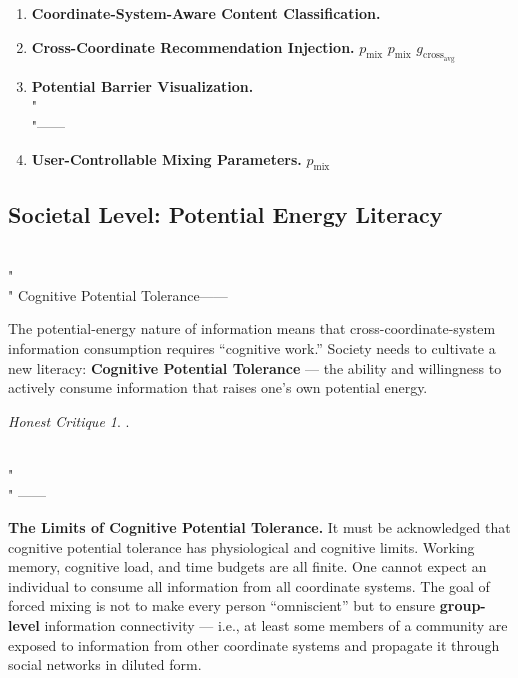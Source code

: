 \documentclass[11pt,a4paper]{article}
\theoremstyle{remark}
\newtheorem{honestattack}{Honest Critique}
\newenvironment{attackbox}{%
  \begin{center}
  \color{red}
  \begin{minipage}{0.92\textwidth}
  \begin{honestattack}
}{%
  \end{honestattack}
  \end{minipage}
  \end{center}
}
\newcommand{\GCoupling}{g_{\text{cross}}}
\begin{document}
\begin{enumerate}[label= \arabic*:, leftmargin=*]
\item \textbf{Coordinate-System-Aware Content Classification.}



\item \textbf{Cross-Coordinate Recommendation Injection.}
 $p_{\text{mix}}$ 
$p_{\text{mix}}$  $\GCoupling_{\text{avg}}$ 

\item \textbf{Potential Barrier Visualization.}
\\"\\"——


\item \textbf{User-Controllable Mixing Parameters.}
 $p_{\text{mix}}$
\end{enumerate}

\subsection{}

\subsection{Societal Level: Potential Energy Literacy}

\\"\\"
\textbf{}
Cognitive Potential Tolerance——


The potential-energy nature of information means that cross-coordinate-system information
consumption requires ``cognitive work.'' Society needs to cultivate a new literacy:
\textbf{Cognitive Potential Tolerance} --- the ability and willingness to actively
consume information that raises one's own potential energy.

\begin{attackbox}
  \textbf{}.
  
  
  
  \\"\\"
  \textbf{}——
  
  

  \textbf{The Limits of Cognitive Potential Tolerance.}
  It must be acknowledged that cognitive potential tolerance has physiological and
  cognitive limits. Working memory, cognitive load, and time budgets are all finite.
  One cannot expect an individual to consume all information from all coordinate systems.
  The goal of forced mixing is not to make every person ``omniscient'' but to ensure
  \textbf{group-level} information connectivity --- i.e., at least some members of a
  community are exposed to information from other coordinate systems and propagate it
  through social networks in diluted form.
\end{attackbox}
\end{document}
